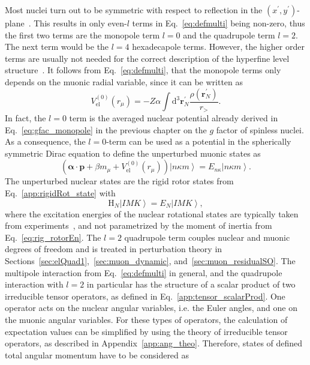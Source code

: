 Most nuclei turn out to be symmetric with respect to reflection in the $(x^\prime ,y^\prime)$-plane~\cite{zickendraht1991}. This results in only even-$l$ terms in Eq.~\eqref{eq:defmulti} being non-zero, thus the first two terms are the monopole term $l=0$ and the quadrupole term $l=2$. The next term would be the $l=4$ hexadecapole terms. However, the higher order terms are usually not needed for the correct description of the hyperfine level structure~\cite{BorieRinker1982}. It follows from Eq.~\eqref{eq:defmulti}, that the monopole terms only depends on the muonic radial variable, since it can be written as
\begin{equation}
V_{\text{el}}^{(0)}(r_\mu)=-Z\alpha \int\text{d}^3\mathbf{r}_N^\prime \frac{\rho(\mathbf{r}_N^\prime)}{r_>}.
\end{equation}
In fact, the $l=0$ term is the averaged nuclear potential already derived in Eq.~\eqref{eq:gfac_monopole} in the previous chapter on the $g$ factor of spinless nuclei. As a consequence, the $l=0$-term can be used as a potential in the spherically symmetric Dirac equation to define the unperturbed muonic states as
\begin{equation}
\label{eq:muonicEn}
\left(\boldsymbol{\alpha} \cdot \mathbf{p} + \beta m_\mu + V_{\text{el}}^{(0)}(r_\mu) \right) \left|n\kappa m\right> = E_{n\kappa}\left|n\kappa m\right>.
\end{equation}
The unperturbed nuclear states are the rigid rotor states from Eq.~\eqref{app:rigidRot_state} with
\begin{equation}
\label{eq:nuclEn}
\text{H}_N \left|IMK\right> = E_N \left|IMK\right>,
\end{equation}
where the excitation energies of the nuclear rotational states are typically taken from experiments~\cite{ENSDF}, and not parametrized by the moment of inertia from Eq.~\eqref{eq:rig_rotorEn}.
The $l=2$ quadrupole term couples nuclear and muonic degrees of freedom and is treated in perturbation theory in Sections~\ref{sec:elQuad1},~\ref{sec:muon_dynamic}, and~\ref{sec:muon_residualSO}. The multipole interaction from Eq.~\eqref{eq:defmulti} in general, and the quadrupole interaction with $l=2$ in particular has the structure of a scalar product of two irreducible tensor operators, as defined in Eq.~\eqref{app:tensor_scalarProd}. One operator acts on the nuclear angular variables, i.e. the Euler angles, and one on the muonic angular variables.
For these types of operators, the calculation of expectation values can be simplified by using the theory of irreducible tensor operators, as described in Appendix~\ref{app:ang_theo}. Therefore, states of defined total angular momentum have to be considered as
